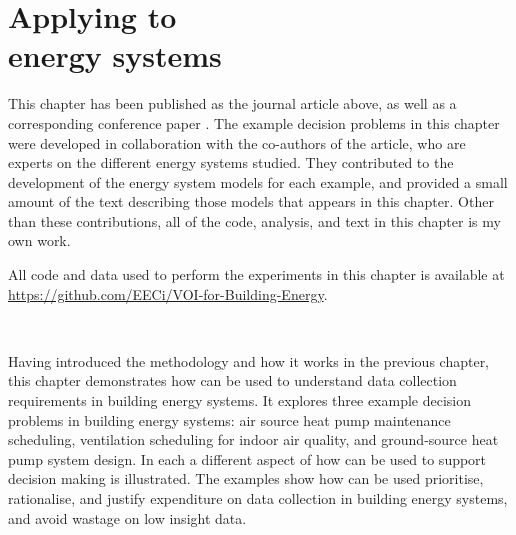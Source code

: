 

\chapter[Applying \glsxtrshort{voi} to energy systems]{Applying  to\\energy systems} \label{chap:demonstrations}

\graphicspath{{Demonstrations/Figs/}}

\begin{cbox}{}

    \noindent{\color{black!50}\rule{\textwidth}{0.4mm}}\vspace{2mm}

    \noindent
    This chapter has been published as the journal article above, as well as a corresponding conference paper \citep{langtry2023ValueInformationAnalysis}.
    The example decision problems in this chapter were developed in collaboration with the co-authors of the article, who are experts on the different energy systems studied. They contributed to the development of the energy system models for each example, and provided a small amount of the text describing those models that appears in this chapter. Other than these contributions, all of the code, analysis, and text in this chapter is my own work.
\end{cbox}

\begin{cbox}{}
    All code and data used to perform the experiments in this chapter is available at \url{https://github.com/EECi/VOI-for-Building-Energy}.
\end{cbox}\


\noindent
Having introduced the  methodology and how it works in the previous chapter, this chapter demonstrates how  can be used to understand data collection requirements in building energy systems. It explores three example decision problems in building energy systems: air source heat pump maintenance scheduling, ventilation scheduling for indoor air quality, and ground-source heat pump system design. In each a different aspect of how  can be used to support decision making is illustrated. The examples show how  can be used prioritise, rationalise, and justify expenditure on data collection in building energy systems, and avoid wastage on low insight data.\\



